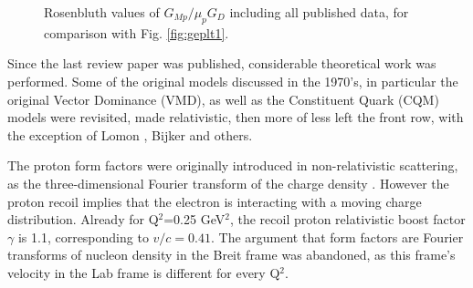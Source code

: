 \begin{figure}
\begin{center}
\caption{Rosenbluth values of $G_{Mp}/\mu_pG_D$ including all published data, for comparison with Fig. \ref{fig:geplt1}.} 
\label{fig:gmpgd_cs}
\end{center}
\end{figure} 

Since the last review paper was published, considerable theoretical work was performed. Some of the original models
discussed in the 1970's, in particular the original Vector Dominance (VMD), as well as the Constituent Quark
(CQM) models were revisited, made relativistic, then more of less left the front row, with the exception of 
Lomon \cite{lomon}, Bijker \cite{bijker} and others.

The proton form factors were originally introduced in non-relativistic scattering, as the three-dimensional Fourier
transform of the charge density \cite{hofs53,wilsonrr}. However the proton recoil implies that the electron
 is interacting with a moving charge distribution. Already for Q$^2$=0.25 GeV$^2$, the recoil proton relativistic 
boost factor $\gamma$ is 1.1, corresponding to $v/c=0.41$.
The argument that form factors are Fourier transforms of nucleon density in the Breit frame was abandoned, as this 
frame's velocity in the Lab frame is different for every Q$^2$.

